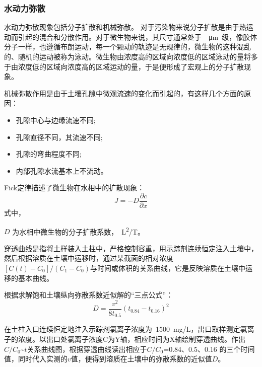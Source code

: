 \subsubsection{水动力弥散}
水动力弥散现象包括分子扩散和机械弥散。 对于污染物来说分子扩散是由于热运动而引起的混合和分散作用。对于微生物来说，其尺寸通常处于~\SI{}{\micro m}~级，像胶体分子一样，也遵循布朗运动，每一个颗动的轨迹是无规律的，微生物的这种混乱的、随机的运动被称为泳动。微生物由浓度高的区域向浓度低的区域泳动的量将多于由浓度低的区域向浓度高的区域运动的量，于是便形成了宏观上的分子扩散现象。\par
机械弥散作用是由于土壤孔隙中微观流速的变化而引起的，有这样几个方面的原因：
\begin{itemize}\setlength{\itemsep}{0em}
\item 孔隙中心与边缘流速不同;
\item 孔隙直径不同，其流速不同;
\item 孔隙的弯曲程度不同;
\item 内部孔隙水流基本上不流动。
\end{itemize}\par
Fick定律描述了微生物在水相中的扩散现象：
\begin{equation}
J=-D\dfrac{\partial c}{\partial x}
\end{equation}
式中，
\begin{paralist}
	\item[$D$]为水相中微生物的分子扩散系数，\SI{}{L^2/T}。
\end{paralist}
穿透曲线是指将土样装入土柱中，严格控制容重，用示踪剂连续恒定注入土壤中，然后根据溶质在土壤中运移时，通过某截面的相对浓度$[C(t)-C_0]/(C_1-C_0)$与时间或体积的关系曲线，它是反映溶质在土壤中运移的基本曲线。\par
根据求解饱和土壤纵向弥散系数近似解的“三点公式”：
\begin{equation}
D=\dfrac{v^2}{8t_{0.5}}(t_{0.84}-t_{0.16})^2
\end{equation}\par
在土柱入口连续恒定地注入示踪剂氯离子浓度为~\SI{1500}{mg/L}，出口取样测定氯离子的浓度。以出口处氯离子浓度C为Y轴，相应时间为X轴绘制穿透曲线。作出$C/C_0$\~$t$关系曲线图，根据穿透曲线读出相应于$C/C_0$=0.84、0.5、0.16 的三个时间值，同时代入实测的$v$值，便得到溶质在土壤中的弥散系数的近似值$D$。
